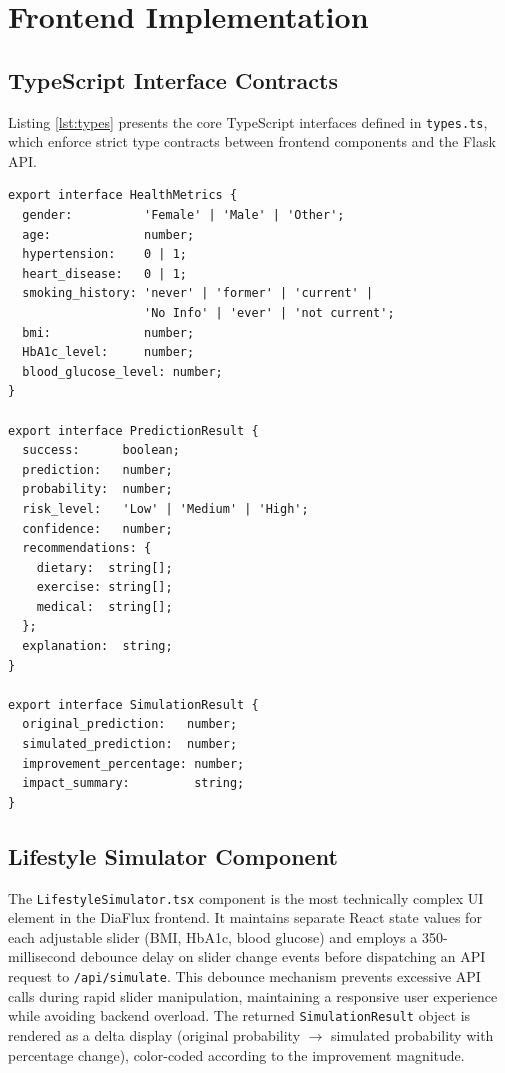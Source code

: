 \documentclass[12pt,a4paper]{report}
\begin{document}
\section{Frontend Implementation}

\subsection{TypeScript Interface Contracts}
Listing \ref{lst:types} presents the core TypeScript interfaces defined in \texttt{types.ts}, which enforce strict type contracts between frontend components and the Flask API.

\begin{lstlisting}[language=HTML, caption=TypeScript Shared Interface Definitions (types.ts), label=lst:types]
export interface HealthMetrics {
  gender:          'Female' | 'Male' | 'Other';
  age:             number;
  hypertension:    0 | 1;
  heart_disease:   0 | 1;
  smoking_history: 'never' | 'former' | 'current' |
                   'No Info' | 'ever' | 'not current';
  bmi:             number;
  HbA1c_level:     number;
  blood_glucose_level: number;
}

export interface PredictionResult {
  success:      boolean;
  prediction:   number;
  probability:  number;
  risk_level:   'Low' | 'Medium' | 'High';
  confidence:   number;
  recommendations: {
    dietary:  string[];
    exercise: string[];
    medical:  string[];
  };
  explanation:  string;
}

export interface SimulationResult {
  original_prediction:   number;
  simulated_prediction:  number;
  improvement_percentage: number;
  impact_summary:         string;
}
\end{lstlisting}

\subsection{Lifestyle Simulator Component}
The \texttt{LifestyleSimulator.tsx} component is the most technically complex UI element in the DiaFlux frontend. It maintains separate React state values for each adjustable slider (BMI, HbA1c, blood glucose) and employs a 350-millisecond debounce delay on slider change events before dispatching an API request to \texttt{/api/simulate}. This debounce mechanism prevents excessive API calls during rapid slider manipulation, maintaining a responsive user experience while avoiding backend overload. The returned \texttt{SimulationResult} object is rendered as a delta display (original probability $\rightarrow$ simulated probability with percentage change), color-coded according to the improvement magnitude.
\end{document}
